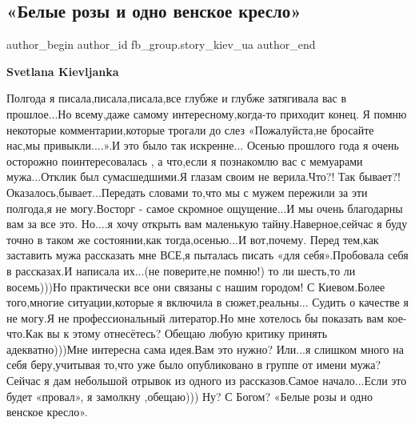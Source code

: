  
 
 
 
 
 
\subsection{«Белые розы и одно венское кресло»}
\label{sec:21_05_2021.fb.fb_group.story_kiev_ua.2.belye_rozy}
\ifcmt
 author_begin
   author_id fb_group.story_kiev_ua
 author_end
\fi

\textbf{Svetlana Kievljanka}

Полгода я писала,писала,писала,все глубже и глубже затягивала вас в прошлое...Но всему,даже самому интересному,когда-то приходит конец.
Я помню некоторые комментарии,которые трогали до слез «Пожалуйста,не бросайте нас,мы привыкли....».И это было так искренне...
Осенью прошлого года я очень осторожно поинтересовалась , а что,если я познакомлю вас с мемуарами мужа...Отклик был сумасшедшими.Я глазам своим не верила.Что?! Так бывает?! Оказалось,бывает...Передать словами то,что мы с мужем пережили за эти полгода,я не могу.Восторг - самое скромное ощущение...И мы очень благодарны вам за все это.
Но....я хочу открыть вам маленькую тайну.Наверное,сейчас я буду точно в таком же состоянии,как тогда,осенью...И вот,почему.
Перед тем,как заставить мужа рассказать мне ВСЕ,я пыталась писать «для себя».Пробовала себя в рассказах.И написала их...(не поверите,не помню!) то ли шесть,то ли восемь)))Но практически все они связаны с нашим городом! С Киевом.Более того,многие ситуации,которые я включила в сюжет,реальны...
Судить о качестве я не могу.Я не профессиональный литератор.Но мне хотелось бы показать вам кое-что.Как вы к этому отнесётесь? Обещаю любую критику принять адекватно)))Мне интересна сама идея.Вам это нужно? Или...я слишком много на себя беру,учитывая то,что уже было опубликовано в группе от имени мужа? 
Сейчас я дам небольшой отрывок из одного из рассказов.Самое начало...Если это будет «провал», я замолкну ,обещаю))) Ну? С Богом?
«Белые розы и одно венское кресло».


